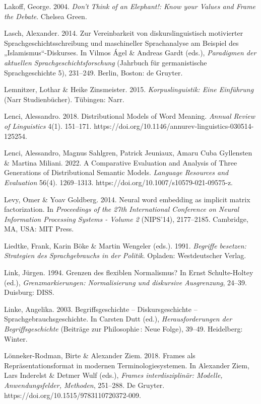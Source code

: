 Lakoff, George. 2004. \emph{Don't Think of an Elephant!: Know your Values and Frame the Debate}. Chelsea Green.

Lasch, Alexander. 2014. Zur Vereinbarkeit von diskurslinguistisch motivierter Sprachgeschichtsschreibung und maschineller Sprachanalyse am Beispiel des „Islamismus``-Diskurses. In Vilmos Ágel \& Andreas Gardt (eds.), \emph{Paradigmen der aktuellen Sprachgeschichtsforschung} (Jahrbuch für germanistische Sprachgeschichte 5), 231--249. Berlin, Boston: de Gruyter.

Lemnitzer, Lothar \& Heike Zinsmeister. 2015. \emph{Korpuslinguistik: Eine Einführung} (Narr Studienbücher). Tübingen: Narr.

Lenci, Alessandro. 2018. Distributional Models of Word Meaning. \emph{Annual Review of Linguistics} 4(1). 151--171. https://doi.org/10.1146/annurev-linguistics-030514-125254.

Lenci, Alessandro, Magnus Sahlgren, Patrick Jeuniaux, Amaru Cuba Gyllensten \& Martina Miliani. 2022. A Comparative Evaluation and Analysis of Three Generations of Distributional Semantic Models. \emph{Language Resources and Evaluation} 56(4). 1269--1313. https://doi.org/10.1007/s10579-021-09575-z.

Levy, Omer \& Yoav Goldberg. 2014. Neural word embedding as implicit matrix factorization. In \emph{Proceedings of the 27th International Conference on Neural Information Processing Systems - Volume 2} (NIPS'14), 2177--2185. Cambridge, MA, USA: MIT Press.

Liedtke, Frank, Karin Böke \& Martin Wengeler (eds.). 1991. \emph{Begriffe besetzen: Strategien des Sprachgebrauchs in der Politik}. Opladen: Westdeutscher Verlag.

Link, Jürgen. 1994. Grenzen des flexiblen Normalismus? In Ernst Schulte-Holtey (ed.), \emph{Grenzmarkierungen: Normalisierung und diskursive Ausgrenzung}, 24--39. Duisburg: DISS.

Linke, Angelika. 2003. Begriffsgeschichte -- Diskursgeschichte -- Sprachgebrauchsgeschichte. In Carsten Dutt (ed.), \emph{Herausforderungen der Begriffsgeschichte} (Beiträge zur Philosophie\,: Neue Folge), 39--49. Heidelberg: Winter.

Lönneker-Rodman, Birte \& Alexander Ziem. 2018. Frames als Repräsentationsformat in modernen Terminologiesystemen. In Alexander Ziem, Lars Inderelst \& Detmer Wulf (eds.), \emph{Frames interdisziplinär: Modelle, Anwendungsfelder, Methoden}, 251--288. De Gruyter. https://doi.org/10.1515/9783110720372-009.

